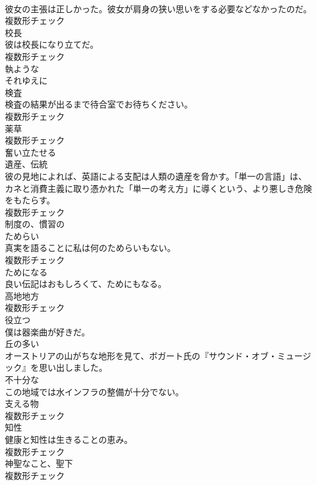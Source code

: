 \documentclass[8pt]{extreport}
\begin{document}
\begin{CJK}{UTF8}{min}
\\	彼女の主張は正しかった。彼女が肩身の狭い思いをする必要などなかったのだ。	
\\	複数形チェック
\\	[名詞]	校⻑	
\\	彼は校長になり立てだ。	
\\	複数形チェック
\\	[形容詞]	執ような	
\\	[副詞]	それゆえに	
\\	[名詞]	検査	
\\	検査の結果が出るまで待合室でお待ちください。	
\\	複数形チェック
\\	[名詞]	薬草	
\\	複数形チェック
\\	[形容詞]	奮い立たせる	
\\	[名詞]	遺産、伝統	
\\	彼の見地によれば、英語による支配は人類の遺産を脅かす。「単一の言語」は、カネと消費主義に取り憑かれた「単一の考え方」に導くという、より悪しき危険をもたらす。	
\\	複数形チェック
\\	[形容詞]	制度の、慣習の	
\\	[名詞]	ためらい	
\\	真実を語ることに私は何のためらいもない。	
\\	複数形チェック
\\	[形容詞]	ためになる	
\\	良い伝記はおもしろくて、ためにもなる。	
\\	[名詞]	高地地方	
\\	複数形チェック
\\	[形容詞]	役立つ	
\\	僕は器楽曲が好きだ。	
\\	[形容詞]	丘の多い	
\\	オーストリアの山がちな地形を見て、ボガート氏の『サウンド・オブ・ミュージック』を思い出しました。	
\\	[形容詞]	不十分な	
\\	この地域では水インフラの整備が十分でない。	
\\	[名詞]	支える物	
\\	複数形チェック
\\	[名詞]	知性	
\\	健康と知性は生きることの恵み。	
\\	複数形チェック
\\	[名詞]	神聖なこと、聖下	
\\	複数形チェック

\end{CJK}
\end{document}

